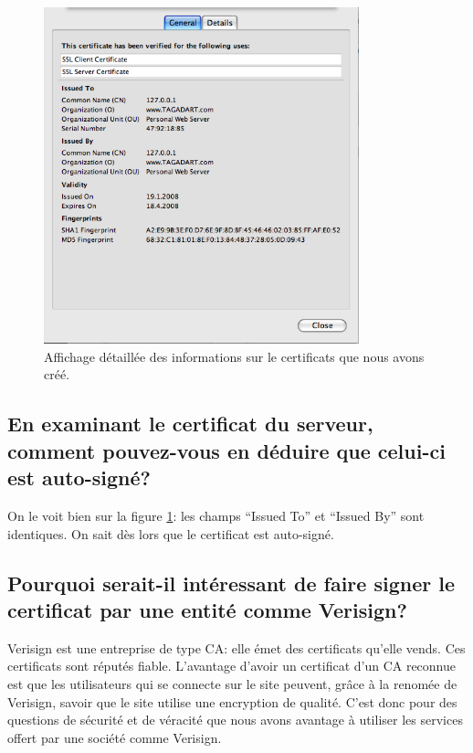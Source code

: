 \documentclass[10pt,a4paper,titlepage]{article}
\begin{document}
\begin{figure}[htbp]
   \begin{center}
      \includegraphics[width=345px]{img/4.png}
   \end{center}
   \caption{Affichage détaillée des informations sur le certificats que nous avons créé.}
	\label{fig:certif}
\end{figure}

\subsection{En examinant le certificat du serveur, comment pouvez-vous en déduire que celui-ci est auto-signé?}

On le voit bien sur la figure \ref{fig:certif}: les champs “Issued To” et “Issued By” sont identiques. On sait dès lors que le certificat est auto-signé. 

\subsection{Pourquoi serait-il intéressant de faire signer le certificat par une entité comme Verisign?}

Verisign est une entreprise de type CA: elle émet des certificats qu'elle vends. Ces certificats sont réputés fiable. L'avantage d'avoir un certificat d'un CA reconnue est que les utilisateurs qui se connecte sur le site peuvent, grâce à la renomée de Verisign, savoir que le site utilise une encryption de qualité. C'est donc pour des questions de sécurité et de véracité que nous avons avantage à utiliser les services offert par une société comme Verisign.
\end{document}
